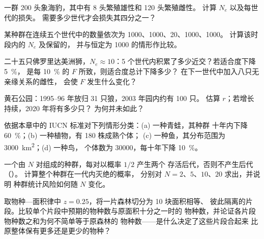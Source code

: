 \begin{exercise}[$\star\star$]\label{exo:b3:conservation-biology:5}
一群 200 头象海豹，其中有 8 头繁殖雄性和 120 头繁殖雌性。
计算 $N_{e}$ 以及每世代的损失。
需要多少世代才会损失其四分之一？
\end{exercise}

\begin{exercise}[$\star\star$]\label{exo:b3:conservation-biology:6}
某种群在连续五个世代中的数量依次为 1000、1000、20、1000、1000。
计算该时段内的 $N_{e}$ 及保留的，
并与恒定为 1000 的情形作比较。
\end{exercise}

\begin{exercise}[$\star\star$]\label{exo:b3:conservation-biology:7}
二十五只佛罗里达美洲狮，$N_{e} \approx 10$：5 个世代内积累了多少近交？若适合度下降 \qty{5}{\%}，
是每 \qty{10}{\%} 的 $F$ 所致，则适合度总计下降多少？
在下一世代中加入八只无亲缘关系的雌性，
会使 $F$ 发生什么变化？
\end{exercise}

\begin{exercise}[$\star\star$]\label{exo:b3:conservation-biology:8}
黄石公园：1995--96 年放归 31 只狼，2003 年园内约有 100 只。
估算 $r$；若增长持续，2020 年将有多少只？
为何并未如此？
\end{exercise}

\begin{exercise}[$\star\star$]\label{exo:b3:conservation-biology:9}
依据本章中的 IUCN 标准对下列情形分类：(a) 一种青蛙，其种群
十年内下降 \qty{60}{\%}；(b) 一种植物，有 180 株成熟个体；
(c) 一种鱼，其分布范围为 \qty{3000}{km^2}；(d) 一种鸟，
个体数为 \num{30000}，每十年下降 \qty{10}{\%}。
\end{exercise}

\begin{exercise}[$\star\star\star$]\label{exo:b3:conservation-biology:10}
一个由 $N$ 对组成的种群，每对以概率 $1/2$ 产生两个
存活后代，否则不产生后代（）。
计算整个种群在一代内灭绝的概率，
分别对 $N = 2$、$5$、$10$、$20$ 求出，并说明
种群统计风险如何随 $N$ 变化。
\end{exercise}

\begin{exercise}[$\star\star\star$]\label{exo:b3:conservation-biology:11}
取物种—面积律中 $z = 0.25$，将一片森林切分为 10 块面积相等、
彼此隔离的片段。比较单个片段中预期的物种数与原面积十分之一时的
物种数，并论证各片段物种数之和为何不简单等于原森林的
物种数——是什么决定了这些片段合起来
比原整体保有更多还是更少的物种？
\end{exercise}

